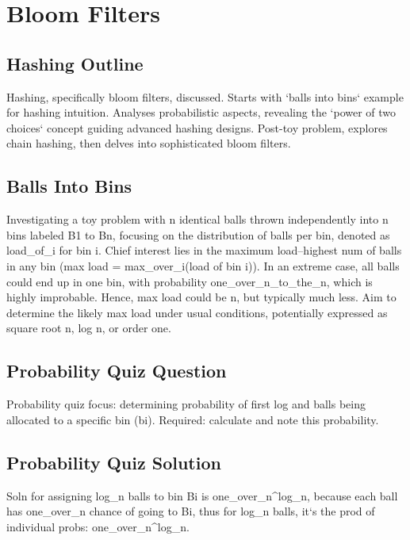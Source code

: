 \section*{Bloom Filters}

\subsection*{Hashing Outline}
Hashing, specifically bloom filters, discussed.
Starts with `balls into bins` example for hashing intuition.
Analyses probabilistic aspects, revealing the `power of two choices` concept guiding advanced hashing designs.
Post-toy problem, explores chain hashing, then delves into sophisticated bloom filters.

\subsection*{Balls Into Bins}
Investigating a toy problem with n identical balls thrown independently into n bins labeled B1 to Bn, focusing on the distribution of balls per bin, denoted as load\_of\_i for bin i.
Chief interest lies in the maximum load--highest num of balls in any bin (max load = max\_over\_i(load of bin i)).
In an extreme case, all balls could end up in one bin, with probability one\_over\_n\_to\_the\_n, which is highly improbable.
Hence, max load could be n, but typically much less.
Aim to determine the likely max load under usual conditions, potentially expressed as square root n, log n, or order one.

\subsection*{Probability Quiz Question}
Probability quiz focus: determining probability of first log and balls being allocated to a specific bin (bi).
Required: calculate and note this probability.

\subsection*{Probability Quiz Solution}
Soln for assigning log\_n balls to bin Bi is one\_over\_n\textasciicircum{}log\_n, because each ball has one\_over\_n chance of going to Bi, thus for log\_n balls, it`s the prod of individual probs: one\_over\_n\textasciicircum{}log\_n.

